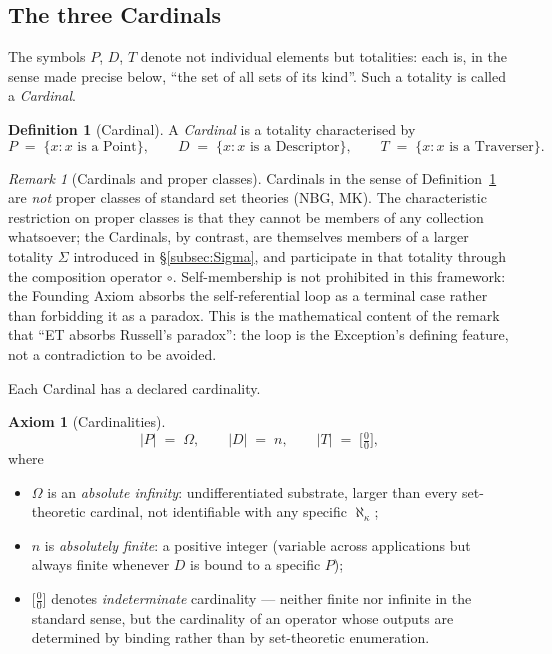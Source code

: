 \documentclass[11pt,a4paper]{article}
\theoremstyle{definition}
\newtheorem{definition}[theorem]{Definition}
\newtheorem{axiom}[theorem]{Axiom}
\theoremstyle{remark}
\newtheorem{remark}[theorem]{Remark}
\begin{document}
\subsection{The three Cardinals}

The symbols $P$, $D$, $T$ denote not individual elements but totalities: each is, in the sense made precise below, ``the set of all sets of its kind''. Such a totality is called a \emph{Cardinal}.

\begin{definition}[Cardinal]\label{def:cardinal}
A \emph{Cardinal} is a totality characterised by
\[
P \;=\; \{x : x \text{ is a Point}\}, \qquad
D \;=\; \{x : x \text{ is a Descriptor}\}, \qquad
T \;=\; \{x : x \text{ is a Traverser}\}.
\]
\end{definition}

\begin{remark}[Cardinals and proper classes]\label{rem:propclass}
Cardinals in the sense of Definition~\ref{def:cardinal} are \emph{not} proper classes of standard set theories (NBG, MK). The characteristic restriction on proper classes is that they cannot be members of any collection whatsoever; the Cardinals, by contrast, are themselves members of a larger totality $\Sigma$ introduced in \S\ref{subsec:Sigma}, and participate in that totality through the composition operator $\circ$. Self-membership is not prohibited in this framework: the Founding Axiom absorbs the self-referential loop as a terminal case rather than forbidding it as a paradox. This is the mathematical content of the remark that ``ET absorbs Russell's paradox'': the loop is the Exception's defining feature, not a contradiction to be avoided.
\end{remark}

Each Cardinal has a declared cardinality.

\begin{axiom}[Cardinalities]\label{ax:cardinalities}
\[
|P| \;=\; \Omega, \qquad |D| \;=\; n, \qquad |T| \;=\; \bigl[\tfrac{0}{0}\bigr],
\]
where
\begin{itemize}[leftmargin=*]
\item $\Omega$ is an \emph{absolute infinity}: undifferentiated substrate, larger than every set-theoretic cardinal, not identifiable with any specific $\aleph_{\kappa}$;
\item $n$ is \emph{absolutely finite}: a positive integer (variable across applications but always finite whenever $D$ is bound to a specific $P$);
\item $\bigl[\tfrac{0}{0}\bigr]$ denotes \emph{indeterminate} cardinality --- neither finite nor infinite in the standard sense, but the cardinality of an operator whose outputs are determined by binding rather than by set-theoretic enumeration.
\end{itemize}
\end{axiom}
\end{document}
